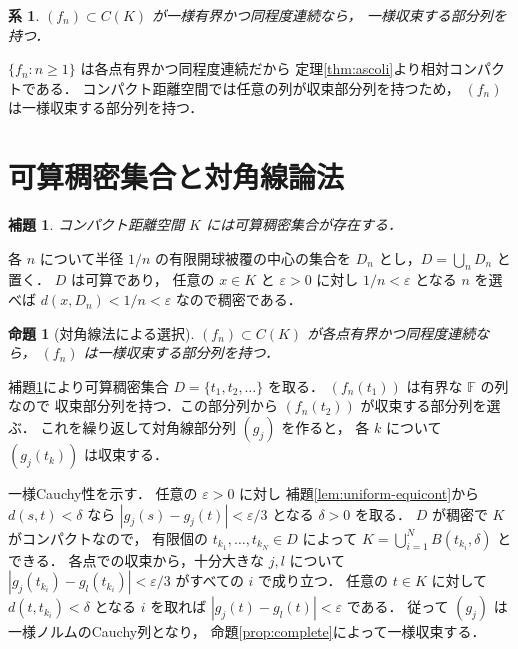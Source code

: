 \documentclass[a5paper,10pt,onecolumn]{jsarticle}
\makeatletter
\theoremstyle{mathnotetheorem}
\newtheorem{lemma}[theorem]{補題}
\newtheorem{proposition}[theorem]{命題}
\newtheorem{corollary}[theorem]{系}
\renewcommand{\proofname}{証明}
\renewenvironment{proof}[1][\proofname]{%
  \par\pushQED{\qed}\normalfont\topsep4\p@\@plus2\p@\relax
  \trivlist\item[\hskip\labelsep\bfseries #1]\ignorespaces
}{\popQED\endtrivlist\@endpefalse}
\makeatother
\begin{document}
\begin{corollary}\label{cor:sequence}
$(f_n)\subset C(K)$ が一様有界かつ同程度連続なら，
一様収束する部分列を持つ．
\end{corollary}
\begin{proof}
$\{f_n:n\ge1\}$ は各点有界かつ同程度連続だから
定理\ref{thm:ascoli}より相対コンパクトである．
コンパクト距離空間では任意の列が収束部分列を持つため，
$(f_n)$ は一様収束する部分列を持つ．
\end{proof}

\section{可算稠密集合と対角線論法}

\begin{lemma}\label{lem:countable-dense}
コンパクト距離空間 $K$ には可算稠密集合が存在する．
\end{lemma}
\begin{proof}
各 $n$ について半径 $1/n$ の有限開球被覆の中心の集合を
$D_n$ とし，$D=\bigcup_nD_n$ と置く．
$D$ は可算であり，
任意の $x\in K$ と $\varepsilon>0$ に対し
$1/n<\varepsilon$ となる $n$ を選べば
$d(x,D_n)<1/n<\varepsilon$ なので稠密である．
\end{proof}

\begin{proposition}[対角線法による選択]\label{prop:diagonal}
$(f_n)\subset C(K)$ が各点有界かつ同程度連続なら，
$(f_n)$ は一様収束する部分列を持つ．
\end{proposition}
\begin{proof}
補題\ref{lem:countable-dense}により可算稠密集合
$D=\{t_1,t_2,\dots\}$ を取る．
$(f_n(t_1))$ は有界な $\mathbb F$ の列なので
収束部分列を持つ．この部分列から
$(f_n(t_2))$ が収束する部分列を選ぶ．
これを繰り返して対角線部分列 $(g_j)$ を作ると，
各 $k$ について $(g_j(t_k))$ は収束する．

一様Cauchy性を示す．
任意の $\varepsilon>0$ に対し
補題\ref{lem:uniform-equicont}から
$d(s,t)<\delta$ なら
$|g_j(s)-g_j(t)|<\varepsilon/3$
となる $\delta>0$ を取る．
$D$ が稠密で $K$ がコンパクトなので，
有限個の $t_{k_1},\dots,t_{k_N}\in D$ によって
$K=\bigcup_{i=1}^NB(t_{k_i},\delta)$ とできる．
各点での収束から，十分大きな $j,l$ について
$|g_j(t_{k_i})-g_l(t_{k_i})|<\varepsilon/3$
がすべての $i$ で成り立つ．
任意の $t\in K$ に対して $d(t,t_{k_i})<\delta$
となる $i$ を取れば
$|g_j(t)-g_l(t)|<\varepsilon$ である．
従って $(g_j)$ は一様ノルムのCauchy列となり，
命題\ref{prop:complete}によって一様収束する．
\end{proof}
\end{document}
